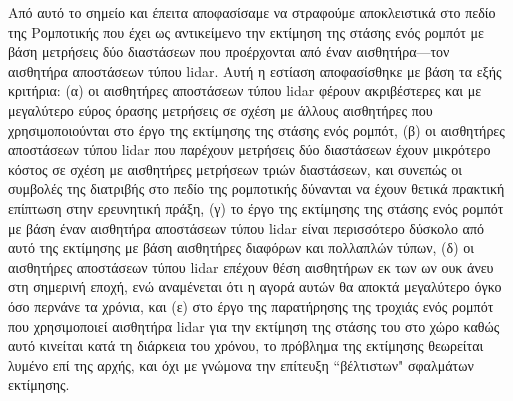 Από αυτό το σημείο και έπειτα αποφασίσαμε να στραφούμε αποκλειστικά στο πεδίο
της Ρομποτικής που έχει ως αντικείμενο την εκτίμηση της στάσης ενός ρομπότ με
βάση μετρήσεις δύο διαστάσεων που προέρχονται από έναν αισθητήρα---τον
αισθητήρα αποστάσεων τύπου lidar. Αυτή η εστίαση αποφασίσθηκε με βάση τα εξής
κριτήρια: (α) οι αισθητήρες αποστάσεων τύπου lidar φέρουν ακριβέστερες και με
μεγαλύτερο εύρος όρασης μετρήσεις σε σχέση με άλλους αισθητήρες που
χρησιμοποιούνται στο έργο της εκτίμησης της στάσης ενός ρομπότ, (β) οι
αισθητήρες αποστάσεων τύπου lidar που παρέχουν μετρήσεις δύο διαστάσεων έχουν
μικρότερο κόστος σε σχέση με αισθητήρες μετρήσεων τριών διαστάσεων, και συνεπώς
οι συμβολές της διατριβής στο πεδίο της ρομποτικής δύνανται να έχουν θετικά
πρακτική επίπτωση στην ερευνητική πράξη, (γ) το έργο της εκτίμησης της στάσης
ενός ρομπότ με βάση έναν αισθητήρα αποστάσεων τύπου lidar είναι περισσότερο
δύσκολο από αυτό της εκτίμησης με βάση αισθητήρες διαφόρων και πολλαπλών τύπων,
(δ) οι αισθητήρες αποστάσεων τύπου lidar επέχουν θέση αισθητήρων εκ των ων ουκ
άνευ στη σημερινή εποχή, ενώ αναμένεται ότι η αγορά αυτών θα αποκτά μεγαλύτερο
όγκο όσο περνάνε τα χρόνια, και (ε) στο έργο της παρατήρησης της τροχιάς ενός
ρομπότ που χρησιμοποιεί αισθητήρα lidar για την εκτίμηση της στάσης του στο
χώρο καθώς αυτό κινείται κατά τη διάρκεια του χρόνου, το πρόβλημα της εκτίμησης
θεωρείται λυμένο επί της αρχής, και όχι με γνώμονα την επίτευξη ``βέλτιστων"
σφαλμάτων εκτίμησης.


